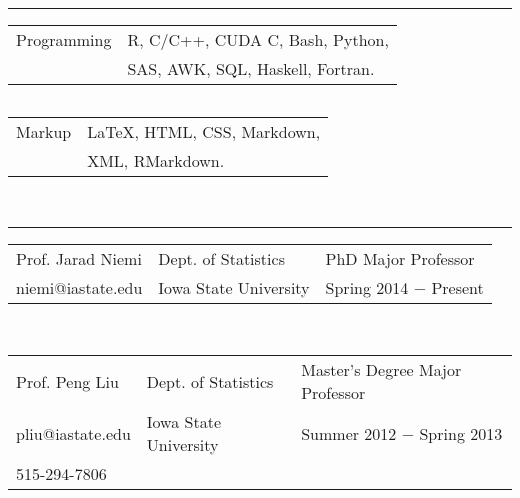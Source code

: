 \documentclass{article}
\newcommand{\q}{$\quad$ \newline}
\newcommand{\vl}{4.25}
\newcommand{\wl}{8.4}
\newcommand{\ww}{13}
\newcommand{\myrule}{\noindent \rule{\textwidth}{1pt}}
\begin{document}

\myrule
 
\noindent \begin{tabular}{@{}p{\vl cm}p{\ww cm}@{}}
Programming & R, C/C++, CUDA C, Bash, Python,  \\
 &SAS, AWK, SQL, Haskell, Fortran.  \\
\end{tabular} \q 

\noindent \begin{tabular}{@{}p{\vl cm}p{\ww cm}@{}}
Markup& LaTeX, HTML, CSS, Markdown,  \\
 & XML, RMarkdown.  \\
\end{tabular} \q \q



\myrule

\noindent \begin{tabular}{@{}p{\vl cm}p{\wl cm}l@{}}
Prof. Jarad Niemi & Dept. of Statistics & PhD Major Professor  \\
niemi@iastate.edu & Iowa State University & Spring 2014 $-$ Present \\
\end{tabular} \q \q

\noindent \begin{tabular}{@{}p{\vl cm}p{\wl cm}l@{}}
Prof. Peng Liu & Dept. of Statistics & Master's Degree Major Professor \\
pliu@iastate.edu & Iowa State University & Summer 2012 $-$ Spring 2013 \\
515-294-7806 & & 
\end{tabular} \q \q




\end{document}
